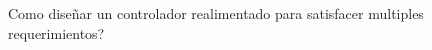 \documentclass[10pt,onecolumn,twoside,letterpaper]{article}
\begin{document}
Como dise\~nar un controlador realimentado para satisfacer multiples requerimientos?\cite{Grizzle2014}\\
\href{run:/home/jackmaster/Downloads/[2014 Jessy W Grizzle and Christine  Chevallereau and Ryan  W Sinner and Aaron D Ames] Art Survey  paper: Models, feedback control and open problems of 3D bipedal robotic walking.pdf}{
}
\end{document}
